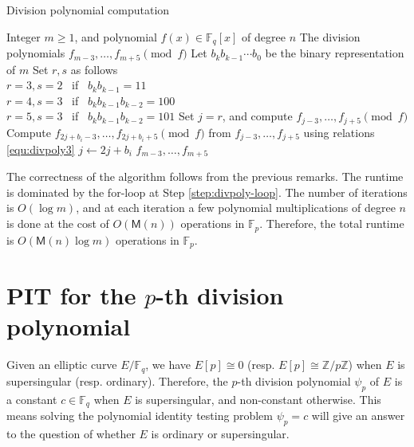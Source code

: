 \documentclass[12pt]{article}
\theoremstyle{plain}
\theoremstyle{definition}
\def\Z{\ensuremath{\mathbb{Z}}}
\def\F{\ensuremath{\mathbb{F}}}
\def\MM{\ensuremath{\mathsf{M}}}
\begin{document}
\begin{algorithm}[H]
	\caption{Division polynomial computation}
	\label{alg:divpoly-comp}
	\begin{algorithmic}[1]
		\Require Integer $m \ge 1$, and polynomial $f(x) \in \F_q[x]$ of degree $n$
		\Ensure The division polynomials $f_{m - 3}, \dots, f_{m + 5} \pmod{f}$
		\State Let $b_kb_{k - 1} \cdots b_0$ be the binary representation of $m$
		\State Set $r, s$ as follows \\
		$r = 3, s = 2$~ if~ $b_kb_{k - 1} = 11$ \\
		$r = 4, s = 3$~ if~ $b_kb_{k - 1}b_{k - 2} = 100$ \\
		$r = 5, s = 3$~ if~ $b_kb_{k - 1}b_{k - 2} = 101$
		\State Set $j = r$, and compute $f_{j - 3}, \dots, f_{j + 5} \pmod{f}$
		\label{step:divpoly-loop} 
			\State Compute $f_{2j + b_i - 3}, \dots, f_{2j + b_i + 5} \pmod{f}$ from $f_{j - 3}, 
			\dots, f_{j + 5}$ using relations \eqref{equ:divpoly3}
			\State $j \leftarrow 2j + b_i$
		\EndFor
		\State \Return $f_{m - 3}, \dots, f_{m + 5}$
	\end{algorithmic}
\end{algorithm}

The correctness of the algorithm follows from the previous remarks. The runtime is dominated by 
the for-loop at Step \ref{step:divpoly-loop}. The number of iterations is $O(\log m)$, and at each 
iteration a few polynomial multiplications of degree $n$ is done at the cost of $O(\MM(n))$ 
operations in $\F_p$. Therefore, the total runtime is $O(\MM(n)\log m)$ operations in $\F_p$.




\section{PIT for the $p$-th division polynomial}
\label{sec:pit-for-div}

Given an elliptic curve $E/\F_q$, we have $E[p] \cong 0$ (resp. $E[p] \cong \Z / p\Z$) when $E$ is 
supersingular (resp. ordinary). Therefore, the $p$-th division polynomial $\psi_p$ of $E$ is a 
constant $c \in \F_q$ when $E$ is supersingular, and non-constant otherwise. This means solving the 
polynomial identity testing problem $\psi_p = c$ will give an answer to the question of whether $E$ 
is ordinary or supersingular. 
\end{document}
